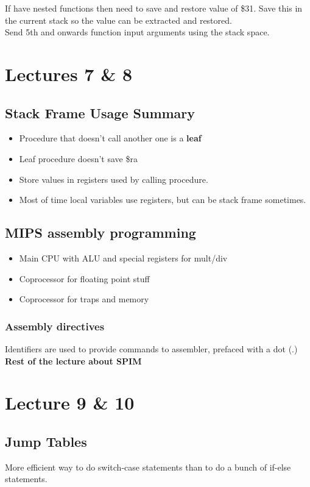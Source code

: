 \documentclass{article}
\begin{document}
		If have nested functions then need to save and restore value of \$31. Save this in the current stack so the value can be extracted and restored.\\

		Send 5th and onwards function input arguments using the stack space.
		

\section{Lectures 7 \& 8}
	\subsection*{Stack Frame Usage Summary}
		\begin{itemize}
			\item Procedure that doesn't call another one is a \textbf{leaf}
			\item Leaf procedure doesn't save \$ra
			\item Store values in registers used by calling procedure.
			\item Most of time local variables use registers, but can be stack frame sometimes.
		\end{itemize}

	\subsection*{MIPS assembly programming}
		\begin{itemize}
			\item Main CPU with ALU and special registers for mult/div
			\item Coprocessor for floating point stuff
			\item Coprocessor for traps and memory
		\end{itemize}

		\subsubsection*{Assembly directives}
		Identifiers are used to provide commands to assembler, prefaced with a dot (.)\\

	\textbf{Rest of the lecture about SPIM}

\newpage
\section{Lecture 9 \& 10}
	\subsection*{Jump Tables}
		More efficient way to do switch-case statements than to do a bunch of if-else statements.
\end{document}

